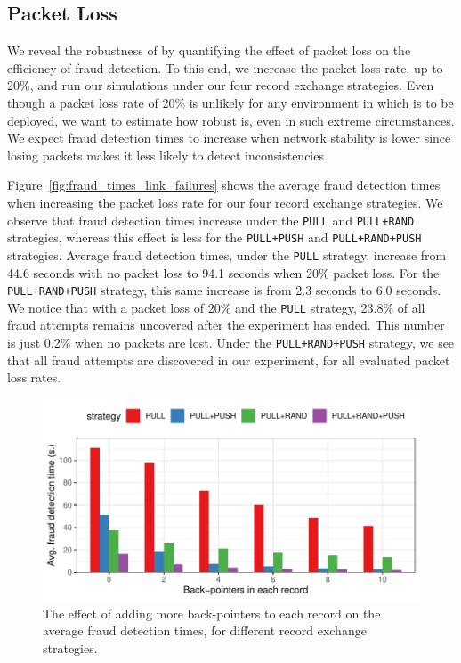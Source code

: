 \subsection{Packet Loss}
We reveal the robustness of \ModelName{} by quantifying the effect of packet loss on the efficiency of fraud detection.
To this end, we increase the packet loss rate, up to 20\%, and run our simulations under our four record exchange strategies.
Even though a packet loss rate of 20\% is unlikely for any environment in which \ModelName{} is to be deployed, we want to estimate how robust \ModelName{} is, even in such extreme circumstances.
We expect fraud detection times to increase when network stability is lower since losing packets makes it less likely to detect inconsistencies.

Figure~\ref{fig:fraud_times_link_failures} shows the average fraud detection times when increasing the packet loss rate for our four record exchange strategies.
We observe that fraud detection times increase under the \texttt{PULL} and \texttt{PULL+RAND} strategies, whereas this effect is less for the \texttt{PULL+PUSH} and \texttt{PULL+RAND+PUSH} strategies.
Average fraud detection times, under the \texttt{PULL} strategy, increase from 44.6 seconds with no packet loss to 94.1 seconds when 20\% packet loss.
For the \texttt{PULL+RAND+PUSH} strategy, this same increase is from 2.3 seconds to 6.0 seconds.
We notice that with a packet loss of 20\% and the \texttt{PULL} strategy, 23.8\% of all fraud attempts remains uncovered after the experiment has ended.
This number is just 0.2\% when no packets are lost.
Under the \texttt{PULL+RAND+PUSH} strategy, we see that all fraud attempts are discovered in our experiment, for all evaluated packet loss rates.

\begin{figure}[t]
	\centering
	\includegraphics[width=.9\linewidth]{trustchain/assets/fraud_times_back_pointers}
	\caption{The effect of adding more back-pointers to each record on the average fraud detection times, for different record exchange strategies.}
	\label{fig:fraud_times_back_pointers}
\end{figure}

